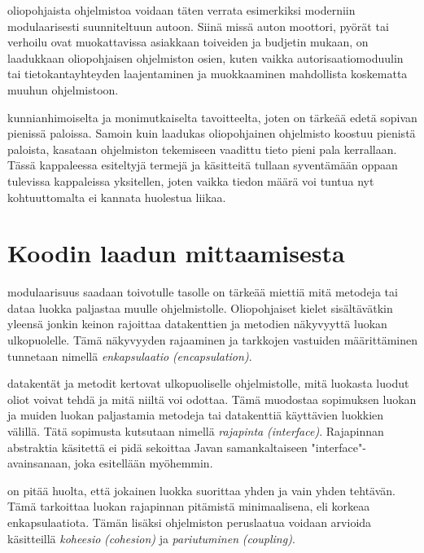 \documentclass{tufte-book}
\newcommand{\eng}[1]{\textit{(#1)}}
\newcommand{\new}[1]{\textit{\gls{#1}}}
\newcommand{\neweng}[2]{\new{#1} \eng{#2}}
\begin{document}
 oliopohjaista ohjelmistoa voidaan täten verrata esimerkiksi
moderniin modulaarisesti suunniteltuun autoon. Siinä missä auton moottori, pyörät tai verhoilu
ovat muokattavissa asiakkaan toiveiden ja budjetin mukaan, on laadukkaan oliopohjaisen ohjelmiston
osien, kuten vaikka autorisaatiomoduulin tai tietokantayhteyden laajentaminen ja muokkaaminen
mahdollista koskematta muuhun ohjelmistoon.

 kunnianhimoiselta ja monimutkaiselta tavoitteelta, joten on tärkeää
edetä sopivan pienissä paloissa. Samoin kuin laadukas oliopohjainen ohjelmisto koostuu pienistä
paloista, kasataan ohjelmiston tekemiseen vaadittu tieto pieni pala kerrallaan. Tässä kappaleessa
esiteltyjä termejä ja käsitteitä tullaan syventämään oppaan tulevissa kappaleissa yksitellen,
joten vaikka tiedon määrä voi tuntua nyt kohtuuttomalta ei kannata huolestua liikaa.


\section{Koodin laadun mittaamisesta}
\label{koodin laadusta}

 modulaarisuus saadaan toivotulle tasolle on tärkeää miettiä mitä
metodeja tai dataa luokka paljastaa muulle ohjelmistolle. Oliopohjaiset kielet sisältävätkin
yleensä jonkin keinon rajoittaa datakenttien ja metodien näkyvyyttä luokan ulkopuolelle. Tämä
näkyvyyden rajaaminen ja tarkkojen vastuiden määrittäminen tunnetaan nimellä
\neweng{enkapsulaatio}{encapsulation}.

 datakentät ja metodit kertovat ulkopuoliselle ohjelmistolle, mitä
luokasta luodut oliot voivat tehdä ja mitä niiltä voi odottaa. Tämä muodostaa sopimuksen luokan ja
muiden luokan paljastamia metodeja tai datakenttiä käyttävien luokkien välillä. Tätä sopimusta
kutsutaan nimellä \neweng{rajapinta}{interface}. Rajapinnan abstraktia käsitettä ei pidä sekoittaa
Javan samankaltaiseen "interface"-avainsanaan, joka esitellään myöhemmin.

 on pitää huolta, että jokainen luokka
suorittaa yhden ja vain yhden tehtävän. Tämä tarkoittaa luokan rajapinnan pitämistä minimaalisena,
eli korkeaa enkapsulaatiota. Tämän lisäksi ohjelmiston peruslaatua voidaan arvioida käsitteillä
\neweng{koheesio}{cohesion} ja \neweng{pariutuminen}{coupling}.
\end{document}
